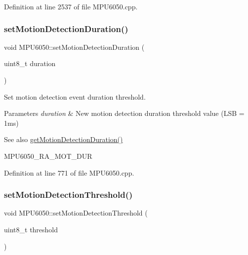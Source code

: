 Definition at line 2537 of file M\+P\+U6050.\+cpp.

\mbox{\label{classMPU6050_a6d81616aaa47539217057891c91ff08f}} 
\subsubsection{\texorpdfstring{setMotionDetectionDuration()}{setMotionDetectionDuration()}}
{\footnotesize\ttfamily void M\+P\+U6050\+::set\+Motion\+Detection\+Duration (\begin{DoxyParamCaption}\item[{uint8\+\_\+t}]{duration }\end{DoxyParamCaption})}



Set motion detection event duration threshold. 


\begin{DoxyParams}{Parameters}
{\em duration} & New motion detection duration threshold value (L\+SB = 1ms) \\
\hline
\end{DoxyParams}
\begin{DoxySeeAlso}{See also}
\mbox{\hyperlink{classMPU6050_a8ba035c2ae4a05d7e51b0d29e4924fb0}{get\+Motion\+Detection\+Duration()}} 

M\+P\+U6050\+\_\+\+R\+A\+\_\+\+M\+O\+T\+\_\+\+D\+UR 
\end{DoxySeeAlso}


Definition at line 771 of file M\+P\+U6050.\+cpp.

\mbox{\label{classMPU6050_aa23c8d66502345c30915e69975fd2cc9}} 
\subsubsection{\texorpdfstring{setMotionDetectionThreshold()}{setMotionDetectionThreshold()}}
{\footnotesize\ttfamily void M\+P\+U6050\+::set\+Motion\+Detection\+Threshold (\begin{DoxyParamCaption}\item[{uint8\+\_\+t}]{threshold }\end{DoxyParamCaption})}



